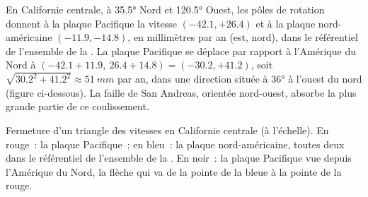 \begin{example}\label{ex:g11:plate-motions:san-andreas}
En Californie centrale, à \ang{35.5} Nord et \ang{120.5} Ouest, les pôles de
rotation donnent à la plaque Pacifique la vitesse $(-42.1, +26.4)$ et à la
plaque nord-américaine $(-11.9, -14.8)$, en millimètres par an (est, nord),
dans le référentiel de l'ensemble de la . La plaque Pacifique se
déplace par rapport à l'Amérique du Nord à $(-42.1 + 11.9,\ 26.4 + 14.8) = (-30.2, +41.2)$, soit
$\sqrt{30.2^2 + 41.2^2} \approx \qty{51}{mm}$ par an, dans une direction
située à \ang{36} à l'ouest du nord (figure ci-dessous). La faille de San
Andreas, orientée nord-ouest, absorbe la plus grande partie de ce
coulissement.
\end{example}

\begin{omfigure}

{\small Fermeture d'un triangle des vitesses en Californie centrale (à
l'échelle). En rouge~: la plaque Pacifique~; en bleu~: la plaque
nord-américaine, toutes deux dans le référentiel de l'ensemble de la
. En noir~: la plaque Pacifique vue depuis l'Amérique du Nord,
la flèche qui va de la pointe de la bleue à la pointe de la rouge.}
\end{omfigure}

